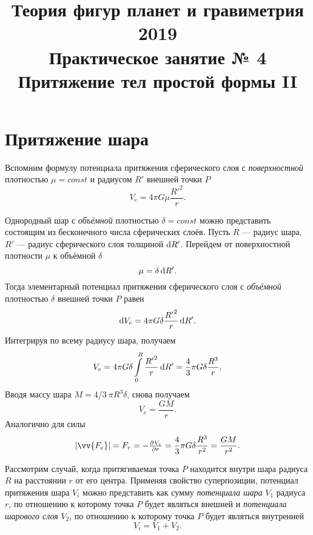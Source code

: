 \documentclass[11pt, a4paper]{article}
\title{{\Large Теория фигур планет и гравиметрия 2019}\\ 
    {\bf\Large Практическое занятие № 4} \\
{\Large Притяжение тел простой формы II}}
\author{}
\date{\DTMusedate{lessondate}}
\theoremstyle{plain}
\theoremstyle{definition}
\theoremstyle{remark}
\begin{document}
\maketitle

\section{Притяжение шара}
Вспомним формулу потенциала притяжения сферического слоя с \textit{поверхностной} плотностью $\mu=const$ и радиусом $R'$ внешней точки $P$
\begin{equation*}
    V_e = 4\pi G\mu\dfrac{{R'}^2}{r}.
\end{equation*}

Однородный шар с \textit{объёмной} плотностью $\delta=const$ можно представить состоящим из бесконечного числа
сферических слоёв. Пусть $R$ --- радиус шара,
$R'$ --- радиус сферического слоя толщиной $\dif R'$. Перейдем от поверхностной плотности $\mu$ к объёмной $\delta$
 \begin{equation*}
    \mu = \delta \dif R'.
\end{equation*}
Тогда элементарный потенциал притяжения сферического слоя с \textit{объёмной} плотностью $\delta$ внешней точки $P$ равен
\begin{equation*}
    \dif V_e = 4\pi G\delta\dfrac{{R'}^2}{r}\dif R'.
\end{equation*}
Интегрируя по всему радиусу шара, получаем
\begin{equation*}
    V_e = 4\pi G\delta \int\limits_{0}^{R}\dfrac{{R'}^2}{r}\dif R' = 
    \dfrac{4}{3}\pi G\delta\dfrac{R^3}{r}.
\end{equation*}
Вводя массу шара $M = 4/3\ \pi R^3 \delta$, снова получаем
\begin{equation*}
    V_e = \dfrac{GM}{r}.
\end{equation*}
Аналогично для силы
\begin{equation*}
    |\vv{F_e}| = F_r = -\pd{V_e}{r} = \dfrac{4}{3}\pi G\delta \dfrac{R^3}{r^2} = 
    \dfrac{GM}{r^2}.
\end{equation*}

Рассмотрим случай, когда притягиваемая точка $P$ находится внутри шара радиуса $R$ на расстоянии $r$ от его центра. Применяя свойство суперпозиции, потенциал притяжения шара $V_i$ можно представить как сумму \textit{потенциала шара} $V_1$ радиуса $r$, по отношению к которому точка $P$ будет являться внешней и \textit{потенциала шарового слоя} $V_2$, по отношению к которому точка $P$ будет являться внутренней
\begin{equation*}
    V_i = V_1 + V_2.
\end{equation*}
\end{document}
